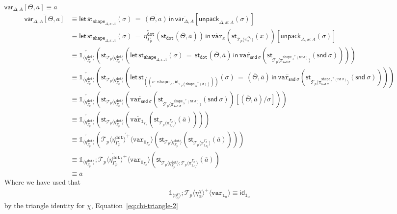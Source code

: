 \documentclass[10pt]{article}
\theoremstyle{definition}
\newcommand\dsd[1]{\ensuremath{\mathsf{#1}}}
\newcommand{\app}[2]{\ensuremath{#1 \: #2}}
\newcommand{\sigmacl}[3]{\ensuremath{(#1{:}#2,#3)}}
\newcommand{\fst}[1]{\app{\dsd{fst}}{#1}}
\newcommand{\snd}[1]{\app{\dsd{snd}}{#1}}
\newcommand{\id}{\mathsf{id}}
\newcommand{\rewrite}[2]{\overleftarrow{#1}(#2)}
\newcommand\StI[2]{\ensuremath{\mathsf{st}_{#1}(#2)}}
\newcommand\StE[4]{\ensuremath{\mathsf{let} \, \StI{#1}{#3} \, = \, {#2} \, \mathsf{in} \, #4}}
\newcommand\TrPlus[2]{\ensuremath{{#1}^+(#2)}}
\newcommand\El[2]{\mathcal{T}_{#1}(#2)}
\newcommand\ApEl[2]{\mathcal{T}_{#1}\langle#2\rangle}
\newcommand\ApPlus[2]{\ensuremath{{#1}^+ \langle #2 \rangle }}
\newcommand\unpack[2]{\ensuremath{\mathsf{unpack}_{#1}(#2)}}
\newcommand{\modeof}[1]{{#1}_p}
\newcommand{\tdot}{\ensuremath{\mathtt{dot}}}
\newcommand{\tshape}[1]{\ensuremath{\mathtt{shape}_{#1}}}
\newcommand{\upstairs}[1]{\overline{#1}}
\newcommand\qvar[1]{\ensuremath{\mathsf{var}_{#1}}}
\newcommand\One{\ensuremath{\mathds{1}}}
\newcommand\var[1]{\ensuremath{\mathtt{var}_{#1}}}
\newcommand\ApOne[1]{\ensuremath{\One_{\langle {#1} \rangle }}}
\begin{document}
\begin{enumerate}[style = multiline, labelwidth = 80pt]
\item[{$\qvar{\Delta,A}[\Theta, a] \equiv a$}]
\begin{align*}
\upstairs{\qvar{\Delta,A}[\Theta, a]}
&\equiv \StE{\tshape{\Delta, x : A}}{\upstairs{(\Theta, a)}}{\sigma}{\upstairs{\qvar{\Delta,A}}[\unpack{\Delta, x : A}{\sigma}]} \\
&\equiv \StE{\tshape{\Delta, x : A}}{\rewrite{\eta^\tdot_{\modeof{\Gamma}}}{\StI{\tdot}{\upstairs{\Theta}, \upstairs{a}}}}{\sigma}{\rewrite{\var{x}}{\StI{\ApEl{p}{\pi^{\modeof{\Delta}}_x}}{x}}[\unpack{\Delta, x : A}{\sigma}]} \\
&\equiv \rewrite{\ApOne{\eta^\tdot_{\modeof{\Gamma}}}}{\StI{\ApEl{p}{\eta^\tdot_{\modeof{\Gamma}}}}{\StE{\tshape{\Delta, x : A}}{\StI{\tdot}{\upstairs{\Theta}, \upstairs{a}}}{\sigma}{\rewrite{\var{\snd \sigma}}{\StI{\ApEl{p}{\pi^{\TrPlus{\tshape{\Delta}}{\fst \sigma}}_{\snd \sigma}}}{\snd \sigma}}}}} \\
&\equiv \rewrite{\ApOne{\eta^\tdot_{\modeof{\Gamma}}}}{\StI{\ApEl{p}{\eta^\tdot_{\modeof{\Gamma}}}}{\StE{(\sigmacl{\sigma}{\tshape{\Delta}}{\id_{\El{p}{\TrPlus{\tshape{\Delta}}{\sigma}}}})}{(\upstairs{\Theta}, \upstairs{a})}{\sigma}{\rewrite{\var{\snd \sigma}}{\StI{\ApEl{p}{\pi^{\TrPlus{\tshape{\Delta}}{\fst \sigma}}_{\snd \sigma}}}{\snd \sigma}}}}} \\
&\equiv \rewrite{\ApOne{\eta^\tdot_{\modeof{\Gamma}}}}{\StI{\ApEl{p}{\eta^\tdot_{\modeof{\Gamma}}}}{\rewrite{\var{\snd \sigma}}{\StI{\ApEl{p}{\pi^{\TrPlus{\tshape{\Delta}}{\fst \sigma}}_{\snd \sigma}}}{\snd \sigma}}[(\upstairs{\Theta}, \upstairs{a})/\sigma]}} \\
&\equiv \rewrite{\ApOne{\eta^\tdot_{\modeof{\Gamma}}}}{\StI{\ApEl{p}{\eta^\tdot_{\modeof{\Gamma}}}}{\rewrite{\var{\One_{\modeof{\Gamma}}}}{\StI{\ApEl{p}{\pi^{\modeof{\Gamma}}_{\One_{\modeof{\Gamma}}}}}{\upstairs{a}}}}} \\
&\equiv \rewrite{\ApOne{\eta^\tdot_{\modeof{\Gamma}}}}{\rewrite{\ApPlus{\ApEl{p}{\eta^\tdot_{\modeof{\Gamma}}}}{\var{\One_{\modeof{\Gamma}}}}}{\StI{\ApEl{p}{\eta^\tdot_{\modeof{\Gamma}}}}{\StI{\ApEl{p}{\pi^{\modeof{\Gamma}}_{\One_{\modeof{\Gamma}}}}}{\upstairs{a}}}}} \\
&\equiv \rewrite{\ApOne{\eta^\tdot_{\modeof{\Gamma}}};\ApPlus{\ApEl{p}{\eta^\tdot_{\modeof{\Gamma}}}}{\var{\One_{\modeof{\Gamma}}}}}{\StI{\ApEl{p}{\eta^\tdot_{\modeof{\Gamma}}};\ApEl{p}{\pi^{\modeof{\Gamma}}_{\One_{\modeof{\Gamma}}}}}{\upstairs{a}}} \\
&\equiv \upstairs{a}
\end{align*}
Where we have used that
\begin{align*}
\ApOne{\eta^\chi_\alpha};\ApPlus{\ApEl{p}{\eta^\chi_\alpha}}{\var{\One_\alpha}} \equiv \id_{\One_\alpha}
\end{align*}
by the triangle identity for $\chi$, Equation~\eqref{eq:chi-triangle-2}


\end{enumerate}
\end{document}
